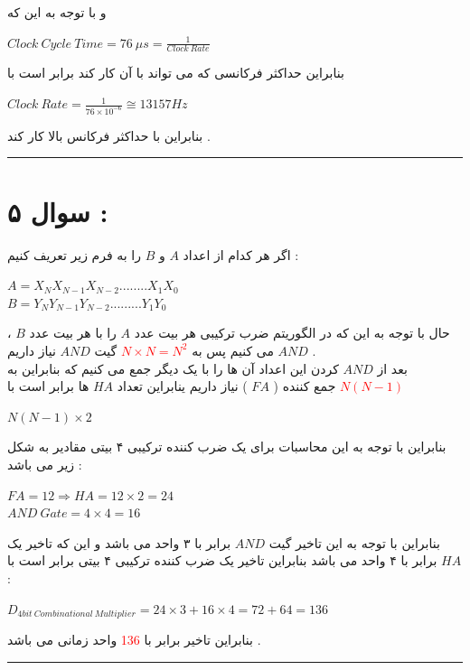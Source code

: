 \documentclass{article}
\begin{document}
و با توجه به این که  
\begin{center}
	$Clock  \  Cycle \  Time = 76  \ \mu s = \frac{1}{Clock  \ Rate}$
\end{center}
بنابراین حداکثر فرکانسی که می تواند با آن کار کند برابر است با 
\begin{center}
	$Clock \ Rate  =  \frac{1}{76 \times 10 ^{-6}} \cong 13157Hz $
\end{center}
بنابراین با حداکثر فرکانس بالا کار کند  . 
\hrule
\section*{سوال ۵ : }
اگر هر کدام از اعداد 
$A$ 
و 
$B$
را به فرم زیر تعریف کنیم  : 
\begin{center}
	$A = X_{N}X_{N-1}X_{N-2}........X_{1}X_{0}$\\
	$B = Y_{N}Y_{N-1}Y_{N-2}.........Y_{1}Y_0$
\end{center}
حال با توجه به این که در الگوریتم ضرب ترکیبی هر بیت عدد 
$A$ 
را با هر بیت عدد 
$B$
، 
$AND$ 
می کنیم پس به 
\textcolor{red}{$N \times N = N^2$}
گیت 
$AND$
نیاز داریم  . \\
بعد از 
$AND$
کردن این اعداد آن ها را با یک دیگر جمع می کنیم که بنابراین به 
\textcolor{red}{$N(N-1)$}
جمع کننده (
$FA$
)
نیاز داریم ینابراین تعداد 
$HA$
ها برابر است با 
\begin{center}
	$N(N-1)\times 2 $
\end{center}
بنابراین با توجه به این محاسبات برای یک ضرب کننده ترکیبی ۴ بیتی مقادیر به شکل زیر می باشد  : 
\begin{center}

	$FA = 12 \Rightarrow HA = 12 \times 2  = 24 $\\
	 $AND \ Gate = 4 \times 4  = 16 $\\
\end{center}
بنابراین با توجه به این تاخیر گیت 
$AND$
برابر با ۳ واحد می باشد و این که تاخیر یک 
$HA$
برابر با ۴ واحد می باشد بنابراین تاخیر یک ضرب کننده  ترکیبی ۴ بیتی برابر است با  : 
\begin{center}
	$ D_{4bit \ Combinational \ Multiplier } = 24 \times 3 + 16 \times 4 = 72 + 64 = 136$
\end{center}
بنابراین تاخیر برابر با 
\textcolor{red}{136}
واحد زمانی می باشد  . 
\hrule
\end{document}
